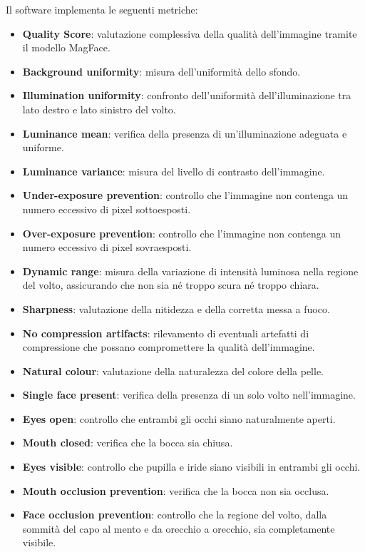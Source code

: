 \documentclass[12pt,a4paper,openright,twoside]{book}
\begin{document}
Il software implementa le seguenti metriche:  
\begin{itemize}
    \item \textbf{Quality Score}: valutazione complessiva della qualità dell'immagine tramite il modello MagFace.
    \item \textbf{Background uniformity}: misura dell'uniformità dello sfondo.
    \item \textbf{Illumination uniformity}: confronto dell'uniformità dell'illuminazione tra lato destro e lato sinistro del volto.
    \item \textbf{Luminance mean}: verifica della presenza di un'illuminazione adeguata e uniforme.
    \item \textbf{Luminance variance}: misura del livello di contrasto dell'immagine.
    \item \textbf{Under-exposure prevention}: controllo che l'immagine non contenga un numero eccessivo di pixel sottoesposti.
    \item \textbf{Over-exposure prevention}: controllo che l'immagine non contenga un numero eccessivo di pixel sovraesposti.
    \item \textbf{Dynamic range}: misura della variazione di intensità luminosa nella regione del volto, assicurando che non sia né troppo scura né troppo chiara.
    \item \textbf{Sharpness}: valutazione della nitidezza e della corretta messa a fuoco.
    \item \textbf{No compression artifacts}: rilevamento di eventuali artefatti di compressione che possano compromettere la qualità dell'immagine.
    \item \textbf{Natural colour}: valutazione della naturalezza del colore della pelle.
    \item \textbf{Single face present}: verifica della presenza di un solo volto nell'immagine.
    \item \textbf{Eyes open}: controllo che entrambi gli occhi siano naturalmente aperti.
    \item \textbf{Mouth closed}: verifica che la bocca sia chiusa.
    \item \textbf{Eyes visible}: controllo che pupilla e iride siano visibili in entrambi gli occhi.
    \item \textbf{Mouth occlusion prevention}: verifica che la bocca non sia occlusa.
    \item \textbf{Face occlusion prevention}: controllo che la regione del volto, dalla sommità del capo al mento e da orecchio a orecchio, sia completamente visibile.

\end{itemize}
\end{document}
